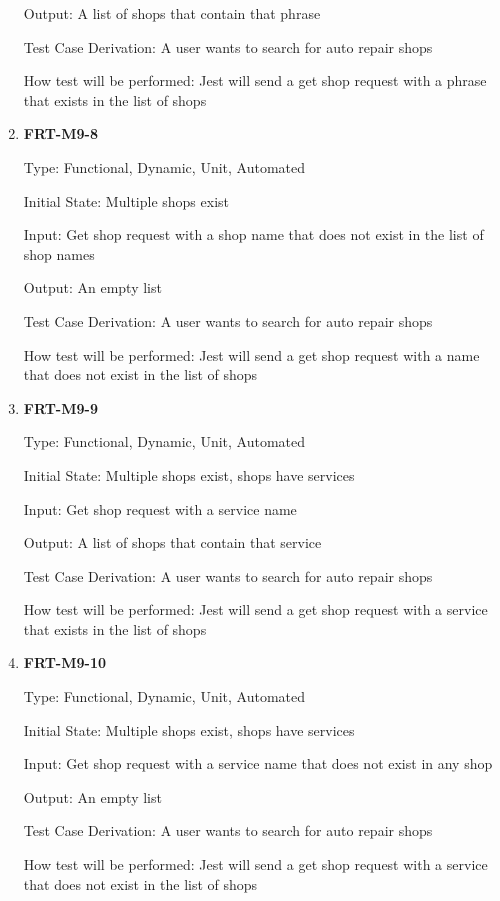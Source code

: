 \documentclass[12pt, titlepage]{article}
\begin{document}
\begin{enumerate}
	      Output: A list of shops that contain that phrase

	      Test Case Derivation: A user wants to search for auto repair shops

	      How test will be performed: Jest will send a get shop request with a phrase that exists in the list
	      of shops

	\item \textbf{FRT-M9-8}

	      Type: Functional, Dynamic, Unit, Automated

	      Initial State: Multiple shops exist

	      Input: Get shop request with a shop name that does not exist in the list of shop names

	      Output: An empty list

	      Test Case Derivation: A user wants to search for auto repair shops

	      How test will be performed: Jest will send a get shop request with a name that does not exist in
	      the list of shops

	\item \textbf{FRT-M9-9}

	      Type: Functional, Dynamic, Unit, Automated

	      Initial State: Multiple shops exist, shops have services

	      Input: Get shop request with a service name

	      Output: A list of shops that contain that service

	      Test Case Derivation: A user wants to search for auto repair shops

	      How test will be performed: Jest will send a get shop request with a service that exists in the
	      list of shops

	\item \textbf{FRT-M9-10}

	      Type: Functional, Dynamic, Unit, Automated

	      Initial State: Multiple shops exist, shops have services

	      Input: Get shop request with a service name that does not exist in any shop

	      Output: An empty list

	      Test Case Derivation: A user wants to search for auto repair shops

	      How test will be performed: Jest will send a get shop request with a service that does not exist in
	      the list of shops

\end{enumerate}
\end{document}
